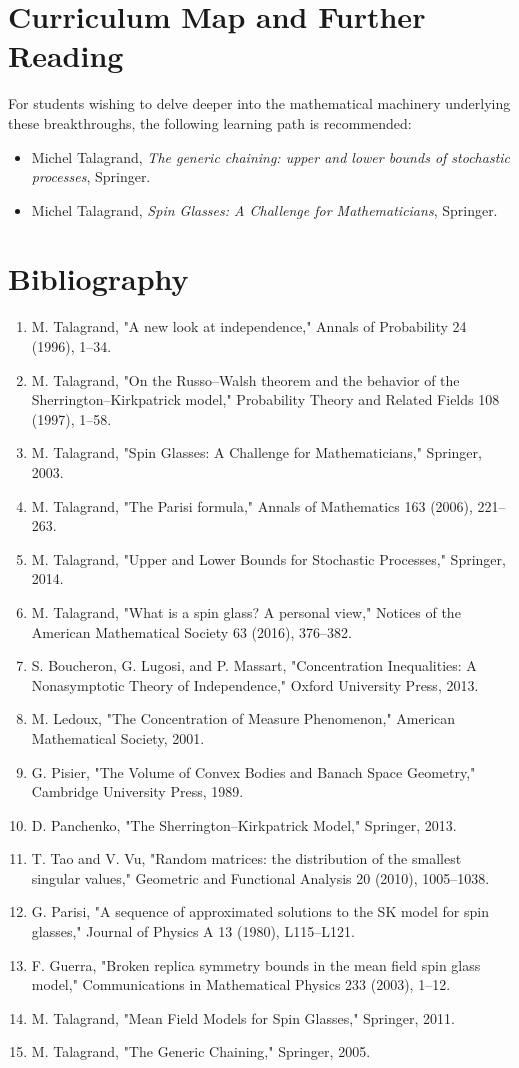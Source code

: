 \section{Curriculum Map and Further Reading}
For students wishing to delve deeper into the mathematical machinery underlying these breakthroughs, the following learning path is recommended:
\begin{itemize}
  \item Michel Talagrand, \emph{The generic chaining: upper and lower bounds of stochastic processes}, Springer.
  \item Michel Talagrand, \emph{Spin Glasses: A Challenge for Mathematicians}, Springer.
\end{itemize}

\section*{Bibliography}
\begin{enumerate}
\item M. Talagrand, "A new look at independence," Annals of Probability 24 (1996), 1--34.
\item M. Talagrand, "On the Russo--Walsh theorem and the behavior of the Sherrington--Kirkpatrick model," Probability Theory and Related Fields 108 (1997), 1--58.
\item M. Talagrand, "Spin Glasses: A Challenge for Mathematicians," Springer, 2003.
\item M. Talagrand, "The Parisi formula," Annals of Mathematics 163 (2006), 221--263.
\item M. Talagrand, "Upper and Lower Bounds for Stochastic Processes," Springer, 2014.
\item M. Talagrand, "What is a spin glass? A personal view," Notices of the American Mathematical Society 63 (2016), 376--382.
\item S. Boucheron, G. Lugosi, and P. Massart, "Concentration Inequalities: A Nonasymptotic Theory of Independence," Oxford University Press, 2013.
\item M. Ledoux, "The Concentration of Measure Phenomenon," American Mathematical Society, 2001.
\item G. Pisier, "The Volume of Convex Bodies and Banach Space Geometry," Cambridge University Press, 1989.
\item D. Panchenko, "The Sherrington--Kirkpatrick Model," Springer, 2013.
\item T. Tao and V. Vu, "Random matrices: the distribution of the smallest singular values," Geometric and Functional Analysis 20 (2010), 1005--1038.
\item G. Parisi, "A sequence of approximated solutions to the SK model for spin glasses," Journal of Physics A 13 (1980), L115--L121.
\item F. Guerra, "Broken replica symmetry bounds in the mean field spin glass model," Communications in Mathematical Physics 233 (2003), 1--12.
\item M. Talagrand, "Mean Field Models for Spin Glasses," Springer, 2011.
\item M. Talagrand, "The Generic Chaining," Springer, 2005.
\end{enumerate}
